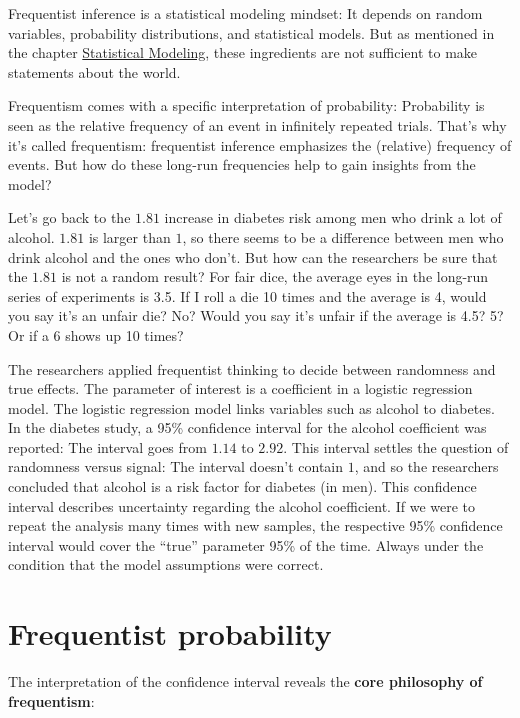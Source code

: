 \documentclass[
  10pt,
]{scrbook}
\begin{document}
Frequentist inference is a statistical modeling mindset:
It depends on random variables, probability distributions, and statistical models.
But as mentioned in the chapter \protect\hyperlink{statistical-modeling}{Statistical Modeling}, these ingredients are not sufficient to make statements about the world.

Frequentism comes with a specific interpretation of probability:
Probability is seen as the relative frequency of an event in infinitely repeated trials.
That's why it's called frequentism: frequentist inference emphasizes the (relative) frequency of events.
But how do these long-run frequencies help to gain insights from the model?

Let's go back to the \(1.81\) increase in diabetes risk among men who drink a lot of alcohol.
\(1.81\) is larger than \(1\), so there seems to be a difference between men who drink alcohol and the ones who don't.
But how can the researchers be sure that the \(1.81\) is not a random result?
For fair dice, the average eyes in the long-run series of experiments is 3.5.
If I roll a die 10 times and the average is 4, would you say it's an unfair die?
No? Would you say it's unfair if the average is 4.5? 5? Or if a 6 shows up 10 times?

The researchers applied frequentist thinking to decide between randomness and true effects.
The parameter of interest is a coefficient in a logistic regression model.
The logistic regression model links variables such as alcohol to diabetes.
In the diabetes study, a 95\% confidence interval for the alcohol coefficient was reported:
The interval goes from \(1.14\) to \(2.92\).
This interval settles the question of randomness versus signal:
The interval doesn't contain \(1\), and so the researchers concluded that alcohol is a risk factor for diabetes (in men).
This confidence interval describes uncertainty regarding the alcohol coefficient.
If we were to repeat the analysis many times with new samples, the respective 95\% confidence interval would cover the ``true'' parameter 95\% of the time.
Always under the condition that the model assumptions were correct.

\hypertarget{frequentist-probability}{%
\section{Frequentist probability}\label{frequentist-probability}}

The interpretation of the confidence interval reveals the \textbf{core philosophy of frequentism}:
\end{document}
